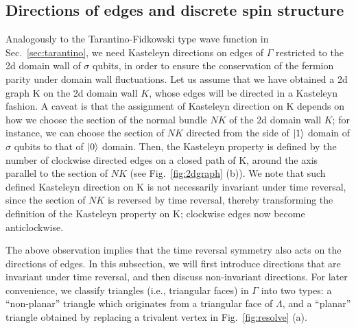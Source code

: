 \documentclass[12pt]{article}
\numberwithin{equation}{section}
\begin{document}
\subsection{Directions of edges and discrete spin structure}
\label{sec:direction}

Analogously to the Tarantino-Fidkowski type wave function in Sec.~\ref{sec:tarantino}, 
we need Kasteleyn directions on edges of $\Gamma$ restricted to the 2d domain wall of $\sigma$ qubits, in order to ensure the conservation of the fermion parity under domain wall fluctuations. Let us assume that we have obtained a 2d graph $\mathrm{K}$ on the 2d domain wall $K$, whose edges will be directed in a Kasteleyn fashion.
A caveat is that the assignment of Kasteleyn direction on $\mathrm{K}$ depends on how we choose the section of the normal bundle $NK$ of the 2d domain wall $K$; for instance, we can choose the section of $NK$ directed from the side of $\ket{1}$ domain of $\sigma$ qubits to that of $\ket{0}$ domain. Then, the Kasteleyn property is defined by the number of clockwise directed edges on a closed path of $\mathrm{K}$, around the axis parallel to the section of $NK$ (see Fig.~\ref{fig:2dgraph} (b)). 
We note that such defined Kasteleyn direction on $\mathrm{K}$ is not necessarily invariant under time reversal, since the section of $NK$ is reversed by time reversal, thereby transforming the definition of the Kasteleyn property on $\mathrm{K}$; clockwise edges now become anticlockwise.

The above observation implies that the time reversal symmetry also acts on the directions of edges. In this subsection, we will first introduce directions that are invariant under time reversal, and then discuss non-invariant directions. 
For later convenience, we classify triangles (i.e., triangular faces) in $\Gamma$ into two types: a ``non-planar'' triangle which originates from a triangular face of $\Lambda$, and a ``planar'' triangle obtained by replacing a trivalent vertex in Fig.~\ref{fig:resolve} (a). 
\end{document}
